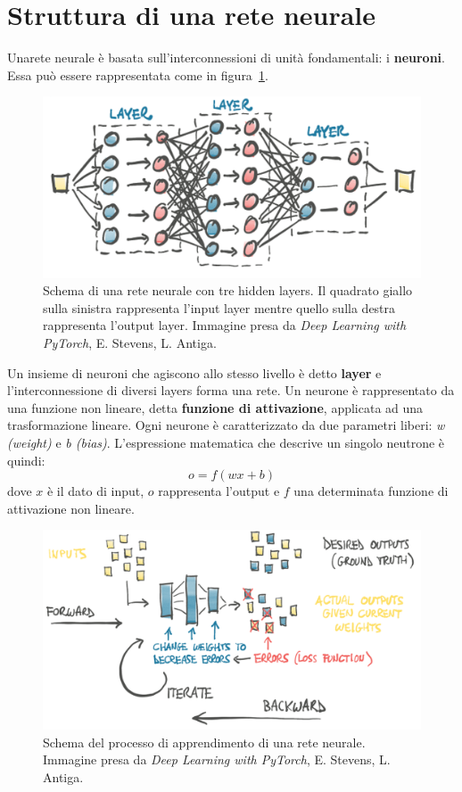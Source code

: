 \documentclass[12pt,a4paper,final]{book}
\begin{document}

\section{Struttura di una rete neurale}\label{struttura_rete}
Unarete neurale è basata sull'interconnessioni di unità fondamentali: i \textbf{neuroni}.
Essa può essere rappresentata come in figura~\ref{schema_rete}.
\begin{figure}[!ht]
	\centering
	\includegraphics[width=0.6\linewidth]{../figures/schema_rete.png}
	\caption{Schema di una rete neurale con tre hidden layers. Il quadrato giallo sulla sinistra rappresenta l'input layer mentre quello sulla destra rappresenta l'output layer. Immagine presa da \textit{Deep Learning with PyTorch}, E. Stevens, L. Antiga\cite{stevens}.}
	\label{schema_rete}
\end{figure}
Un insieme di neuroni che agiscono allo stesso livello è detto \textbf{layer} e l'interconnessione di diversi layers forma una rete.
Un neurone è rappresentato da una funzione non lineare, detta \textbf{funzione di attivazione}, applicata ad una trasformazione lineare. Ogni neurone è caratterizzato da due parametri liberi: \textit{w (weight)} e \textit{b (bias)}. L'espressione matematica che descrive un singolo neutrone è quindi:
\[o=f(wx+b)\]
 dove $x$ è il dato di input, $o$ rappresenta l'output e $f$ una determinata funzione di attivazione non lineare.

\begin{figure}[!ht]
	\centering
	\includegraphics[width=0.7\linewidth]{../figures/learning_process.png}
	\caption{Schema del processo di apprendimento di una rete neurale. Immagine presa da \textit{Deep Learning with PyTorch}, E. Stevens, L. Antiga\cite{stevens}.}
	\label{apprendimento}
\end{figure}
\end{document}
